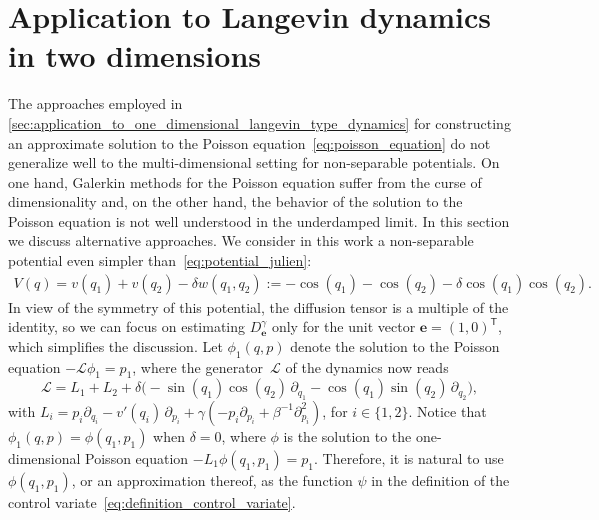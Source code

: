 \documentclass[11pt,a4paper]{article}
\newcommand{\vect}[1]{\boldsymbol{\mathbf #1}}
\renewcommand{\t}{\mathsf T}
\theoremstyle{plain}
\numberwithin{equation}{section}
\begin{document}

\section{Application to Langevin dynamics in two dimensions}%
\label{sec:applications_2d}%
The approaches employed in \cref{sec:application_to_one_dimensional_langevin_type_dynamics} for constructing an approximate solution to the Poisson equation~\eqref{eq:poisson_equation}
do not generalize well to the multi-dimensional setting for non-separable potentials.
On one hand, Galerkin methods for the Poisson equation suffer from the curse of dimensionality and,
on the other hand, the behavior of the solution to the Poisson equation is not well understood in the underdamped limit.
In this section we discuss alternative approaches.
We consider in this work a non-separable potential even simpler than~\eqref{eq:potential_julien}:
\begin{align*}
    \label{eq:potential_simple}
    V(q) =  v(q_1) + v(q_2) - \delta w(q_1, q_2) := - \cos(q_1) - \cos(q_2) - \delta \cos(q_1) \cos(q_2).
\end{align*}
In view of the symmetry of this potential,
the diffusion tensor is a multiple of the identity,
so we can focus on estimating $D^{\gamma}_{\vect e}$ only for the unit vector $\vect e = (1, 0)^\t$,
which simplifies the discussion.
Let $\phi_1(q, p)$ denote the solution to the Poisson equation $- \mathcal L \phi_1 = p_1$,
where the generator~$\mathcal L$ of the dynamics now reads
\[
    \mathcal L = L_1 + L_2
    + \delta \bigl( -\sin(q_1) \cos(q_2) \, \partial_{q_1} - \cos(q_1) \sin (q_2) \, \partial_{q_2} \bigr),
\]
with $L_i = p_i \partial_{q_i} - v'(q_i) \, \partial_{p_i} + \gamma \left(- p_i \partial_{p_i} + \beta^{-1} \partial^2_{p_i} \right)$,
for $i \in \{1, 2\}$.
Notice that $\phi_1(q, p) = \phi(q_1, p_1)$ when $\delta = 0$,
where $\phi$ is the solution to the one-dimensional Poisson equation $-L_1 \phi(q_1, p_1) = p_1$.
Therefore, it is natural to use $\phi(q_1, p_1)$, or an approximation thereof,
as the function $\psi$ in the definition of the control variate~\eqref{eq:definition_control_variate}.
\end{document}

